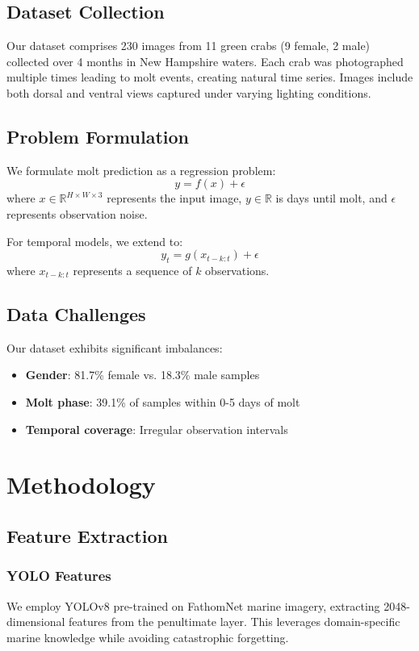 \documentclass[10pt,twocolumn,letterpaper]{article}
\begin{document}
\subsection{Dataset Collection}
Our dataset comprises 230 images from 11 green crabs (9 female, 2 male) collected over 4 months in New Hampshire waters. Each crab was photographed multiple times leading to molt events, creating natural time series. Images include both dorsal and ventral views captured under varying lighting conditions.

\subsection{Problem Formulation}
We formulate molt prediction as a regression problem:
\begin{equation}
y = f(x) + \epsilon
\end{equation}
where $x \in \mathbb{R}^{H \times W \times 3}$ represents the input image, $y \in \mathbb{R}$ is days until molt, and $\epsilon$ represents observation noise.

For temporal models, we extend to:
\begin{equation}
y_t = g(x_{t-k:t}) + \epsilon
\end{equation}
where $x_{t-k:t}$ represents a sequence of $k$ observations.

\subsection{Data Challenges}
Our dataset exhibits significant imbalances:
\begin{itemize}
\item \textbf{Gender}: 81.7\% female vs. 18.3\% male samples
\item \textbf{Molt phase}: 39.1\% of samples within 0-5 days of molt
\item \textbf{Temporal coverage}: Irregular observation intervals
\end{itemize}

\section{Methodology}

\subsection{Feature Extraction}

\subsubsection{YOLO Features}
We employ YOLOv8 pre-trained on FathomNet marine imagery, extracting 2048-dimensional features from the penultimate layer. This leverages domain-specific marine knowledge while avoiding catastrophic forgetting.
\end{document}
